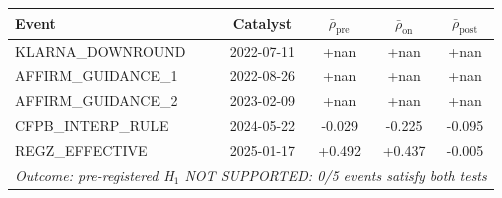 \begin{tabular}{lcccc}
\toprule
Event & Catalyst & $\bar{\rho}_{\mathrm{pre}}$ & $\bar{\rho}_{\mathrm{on}}$ & $\bar{\rho}_{\mathrm{post}}$ \\
\midrule
KLARNA\_DOWNROUND & 2022-07-11 & +nan & +nan & +nan \\
AFFIRM\_GUIDANCE\_1 & 2022-08-26 & +nan & +nan & +nan \\
AFFIRM\_GUIDANCE\_2 & 2023-02-09 & +nan & +nan & +nan \\
CFPB\_INTERP\_RULE & 2024-05-22 & -0.029 & -0.225 & -0.095 \\
REGZ\_EFFECTIVE & 2025-01-17 & +0.492 & +0.437 & -0.005 \\
\midrule
\multicolumn{5}{l}{\emph{Outcome: pre-registered H$_1$ NOT SUPPORTED: 0/5 events satisfy both tests}} \\
\bottomrule
\end{tabular}
